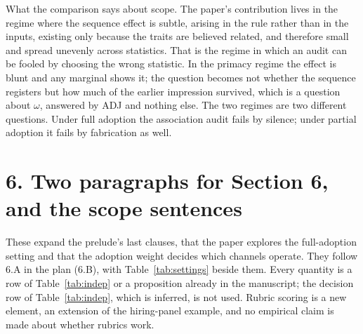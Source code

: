 \documentclass[11pt,a4paper]{article}
\begin{document}
\noindent What the comparison says about scope. The paper's contribution lives
in the regime where the sequence effect is subtle, arising in the rule rather
than in the inputs, existing only because the traits are believed related, and
therefore small and spread unevenly across statistics. That is the regime in
which an audit can be fooled by choosing the wrong statistic. In the primacy
regime the effect is blunt and any marginal shows it; the question becomes not
whether the sequence registers but how much of the earlier impression
survived, which is a question about $\omega$, answered by ADJ and nothing
else. The two regimes are two different questions. Under full adoption the
association audit fails by silence; under partial adoption it fails by
fabrication as well.

\section*{6. Two paragraphs for Section 6, and the scope sentences}

\noindent These expand the prelude's last clauses, that the paper explores
the full-adoption setting and that the adoption weight decides which channels
operate. They follow 6.A in the plan (6.B), with Table~\ref{tab:settings}
beside them. Every quantity is a row of Table~\ref{tab:indep} or a
proposition already in the manuscript; the decision row of
Table~\ref{tab:indep}, which is inferred, is not used. Rubric scoring is a
new element, an extension of the hiring-panel example, and no empirical claim
is made about whether rubrics work.
\end{document}
